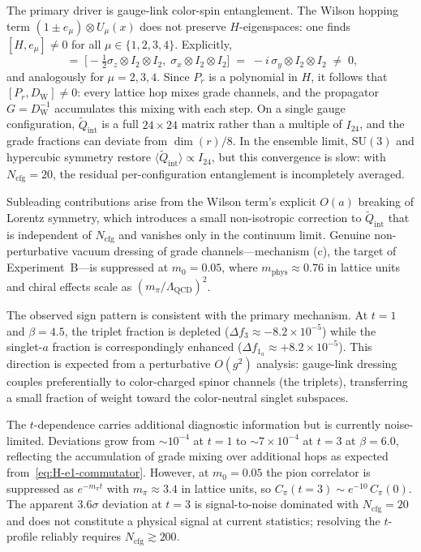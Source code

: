 \documentclass[12pt]{article}
\theoremstyle{definition}
\theoremstyle{remark}
\newcommand{\su}{\mathrm{SU}}           %
\newcommand{\dW}{D_{\mathrm{W}}}        %
\newcommand{\Qtil}{\widetilde{Q}}                    %
\newcommand{\Ncfg}{N_{\mathrm{cfg}}}                  %
\begin{document}
	The primary driver is gauge-link color-spin entanglement.  The Wilson hopping
	term $(1\pm e_\mu)\otimes U_\mu(x)$ does not preserve $H$-eigenspaces: one
	finds $[H, e_\mu]\neq 0$ for all $\mu\in\{1,2,3,4\}$.  Explicitly,
	\begin{equation}
		[H,\, e_1]
		\;=\;
		\bigl[-\tfrac{1}{2}\sigma_z\otimes I_2\otimes I_2,\;
		\sigma_x\otimes I_2\otimes I_2\bigr]
		\;=\;
		-i\,\sigma_y\otimes I_2\otimes I_2
		\;\neq\; 0,
		\label{eq:H-e1-commutator}
	\end{equation}
	and analogously for $\mu=2,3,4$.  Since $P_r$ is a polynomial in $H$, it
	follows that $[P_r, \dW]\neq 0$: every lattice hop mixes grade channels, and
	the propagator $G = \dW^{-1}$ accumulates this mixing with each step.  On a
	single gauge configuration, $\Qtil_{\mathrm{int}}$ is a full $24\times24$
	matrix rather than a multiple of $I_{24}$, and the grade fractions can deviate
	from $\dim(r)/8$.  In the ensemble limit, $\su(3)$ and hypercubic symmetry
	restore $\langle\Qtil_{\mathrm{int}}\rangle\propto I_{24}$, but this
	convergence is slow: with $\Ncfg=20$, the residual per-configuration
	entanglement is incompletely averaged.
	
	Subleading contributions arise from the Wilson term's explicit $O(a)$ breaking
	of Lorentz symmetry, which introduces a small non-isotropic correction to
	$\Qtil_{\mathrm{int}}$ that is independent of $\Ncfg$ and vanishes only in the
	continuum limit.  Genuine non-perturbative vacuum dressing of grade
	channels---mechanism (c), the target of Experiment~B---is suppressed at
	$m_0=0.05$, where $m_{\mathrm{phys}}\approx0.76$ in lattice units and chiral
	effects scale as $(m_\pi/\Lambda_{\mathrm{QCD}})^2$.
	
	The observed sign pattern is consistent with the primary mechanism.  At $t=1$
	and $\beta=4.5$, the triplet fraction is depleted
	($\Delta f_3\approx-8.2\times10^{-5}$) while the singlet-$a$ fraction is
	correspondingly enhanced ($\Delta f_{1_a}\approx+8.2\times10^{-5}$).  This
	direction is expected from a perturbative $O(g^2)$ analysis: gauge-link
	dressing couples preferentially to color-charged spinor channels (the
	triplets), transferring a small fraction of weight toward the color-neutral
	singlet subspaces.
	
	The $t$-dependence carries additional diagnostic information but is currently
	noise-limited.  Deviations grow from $\sim10^{-4}$ at $t=1$ to
	$\sim7\times10^{-4}$ at $t=3$ at $\beta=6.0$, reflecting the accumulation of
	grade mixing over additional hops as expected from~\eqref{eq:H-e1-commutator}.
	However, at $m_0=0.05$ the pion correlator is suppressed as $e^{-m_\pi t}$
	with $m_\pi\approx3.4$ in lattice units, so $C_\pi(t{=}3)\sim
	e^{-10}\,C_\pi(0)$.  The apparent $3.6\sigma$ deviation at $t=3$ is
	signal-to-noise dominated with $\Ncfg=20$ and does not constitute a physical
	signal at current statistics; resolving the $t$-profile reliably requires
	$\Ncfg\gtrsim200$.
	
\end{document}

